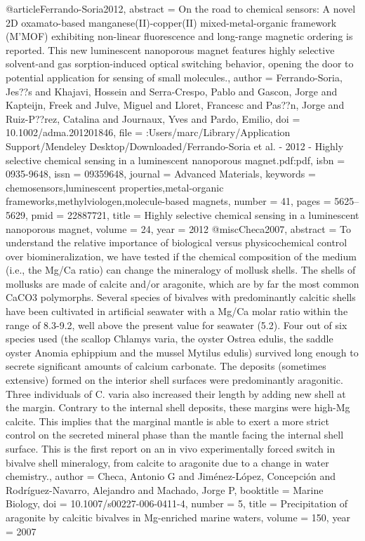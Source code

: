 @article{Ferrando-Soria2012,
abstract = {On the road to chemical sensors: A novel 2D oxamato-based manganese(II)-copper(II) mixed-metal-organic framework (M'MOF) exhibiting non-linear fluorescence and long-range magnetic ordering is reported. This new luminescent nanoporous magnet features highly selective solvent-and gas sorption-induced optical switching behavior, opening the door to potential application for sensing of small molecules.},
author = {Ferrando-Soria, Jes??s and Khajavi, Hossein and Serra-Crespo, Pablo and Gascon, Jorge and Kapteijn, Freek and Julve, Miguel and Lloret, Francesc and Pas??n, Jorge and Ruiz-P??rez, Catalina and Journaux, Yves and Pardo, Emilio},
doi = {10.1002/adma.201201846},
file = {:Users/marc/Library/Application Support/Mendeley Desktop/Downloaded/Ferrando-Soria et al. - 2012 - Highly selective chemical sensing in a luminescent nanoporous magnet.pdf:pdf},
isbn = {0935-9648},
issn = {09359648},
journal = {Advanced Materials},
keywords = {chemosensors,luminescent properties,metal-organic frameworks,methylviologen,molecule-based magnets},
number = {41},
pages = {5625--5629},
pmid = {22887721},
title = {{Highly selective chemical sensing in a luminescent nanoporous magnet}},
volume = {24},
year = {2012}
}
@misc{Checa2007,
abstract = {To understand the relative importance of biological versus physicochemical control over biomineralization, we have tested if the chemical composition of the medium (i.e., the Mg/Ca ratio) can change the mineralogy of mollusk shells. The shells of mollusks are made of calcite and/or aragonite, which are by far the most common CaCO3 polymorphs. Several species of bivalves with predominantly calcitic shells have been cultivated in artificial seawater with a Mg/Ca molar ratio within the range of 8.3-9.2, well above the present value for seawater (5.2). Four out of six species used (the scallop Chlamys varia, the oyster Ostrea edulis, the saddle oyster Anomia ephippium and the mussel Mytilus edulis) survived long enough to secrete significant amounts of calcium carbonate. The deposits (sometimes extensive) formed on the interior shell surfaces were predominantly aragonitic. Three individuals of C. varia also increased their length by adding new shell at the margin. Contrary to the internal shell deposits, these margins were high-Mg calcite. This implies that the marginal mantle is able to exert a more strict control on the secreted mineral phase than the mantle facing the internal shell surface. This is the first report on an in vivo experimentally forced switch in bivalve shell mineralogy, from calcite to aragonite due to a change in water chemistry.},
author = {Checa, Antonio G and Jim{\'{e}}nez-L{\'{o}}pez, Concepci{\'{o}}n and Rodr{\'{i}}guez-Navarro, Alejandro and Machado, Jorge P},
booktitle = {Marine Biology},
doi = {10.1007/s00227-006-0411-4},
number = {5},
title = {{Precipitation of aragonite by calcitic bivalves in Mg-enriched marine waters}},
volume = {150},
year = {2007}
}
